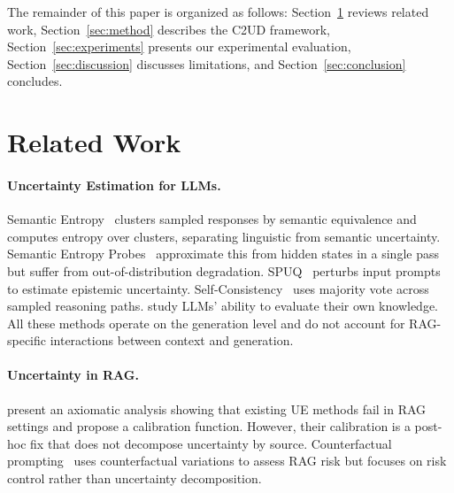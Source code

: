 \documentclass{article}
\newcommand{\ours}{\textsc{C2UD}}
\begin{document}
The remainder of this paper is organized as follows: Section~\ref{sec:related} reviews related work, Section~\ref{sec:method} describes the \ours{} framework, Section~\ref{sec:experiments} presents our experimental evaluation, Section~\ref{sec:discussion} discusses limitations, and Section~\ref{sec:conclusion} concludes.

\section{Related Work}
\label{sec:related}

\paragraph{Uncertainty Estimation for LLMs.}
Semantic Entropy~\citep{kuhn2023semantic,farquhar2024detecting} clusters sampled responses by semantic equivalence and computes entropy over clusters, separating linguistic from semantic uncertainty.
Semantic Entropy Probes~\citep{kossen2024semantic} approximate this from hidden states in a single pass but suffer from out-of-distribution degradation.
SPUQ~\citep{gao2024spuq} perturbs input prompts to estimate epistemic uncertainty.
Self-Consistency~\citep{wang2023selfconsistency} uses majority vote across sampled reasoning paths.
\citet{kadavath2022language} study LLMs' ability to evaluate their own knowledge.
All these methods operate on the generation level and do not account for RAG-specific interactions between context and generation.

\paragraph{Uncertainty in RAG.}
\citet{soudani2025why} present an axiomatic analysis showing that existing UE methods fail in RAG settings and propose a calibration function.
However, their calibration is a post-hoc fix that does not decompose uncertainty by source.
Counterfactual prompting~\citep{xia2024controlling} uses counterfactual variations to assess RAG risk but focuses on risk control rather than uncertainty decomposition.
\end{document}
